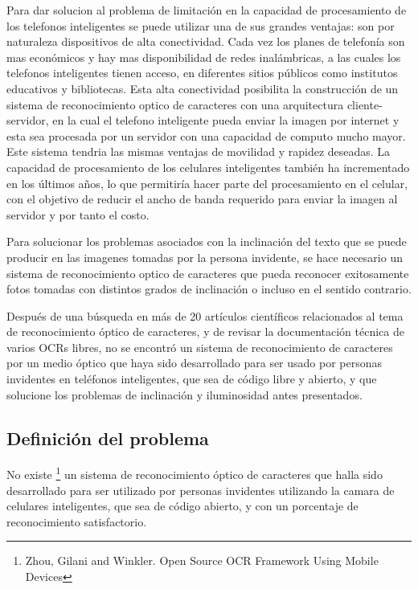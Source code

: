 \documentclass[a4paper, 11pt, oneside]{article}
\begin{document}
	Para dar solucion al problema de limitación en la capacidad de procesamiento de los telefonos inteligentes se puede utilizar una de sus grandes ventajas: son por naturaleza dispositivos de alta conectividad. Cada vez los planes de telefonía son mas económicos y hay mas disponibilidad de redes inalámbricas, a las cuales los telefonos inteligentes tienen acceso, en diferentes sitios públicos como institutos educativos y bibliotecas. Esta alta conectividad posibilita la construcción de un sistema de reconocimiento optico de caracteres con una arquitectura cliente-servidor, en la cual el telefono inteligente pueda enviar la imagen por internet y esta sea procesada por un servidor con una capacidad de computo mucho mayor. Este sistema tendria las mismas ventajas de movilidad y rapidez deseadas. La capacidad de procesamiento de los celulares inteligentes también ha incrementado en los últimos años, lo que permitiría hacer parte del procesamiento en el celular, con el objetivo de reducir el ancho de banda requerido para enviar la imagen al servidor y por tanto el costo.

	Para solucionar los problemas asociados con la inclinación del texto que se puede producir en las imagenes tomadas por la persona invidente, se hace necesario un sistema de reconocimiento optico de caracteres que pueda reconocer exitosamente fotos tomadas con distintos grados de inclinación o incluso en el sentido contrario.

Después de una búsqueda en más de 20 artículos científicos relacionados al tema de reconocimiento óptico de caracteres, y de revisar la documentación técnica de varios OCRs libres, no se encontró un sistema de reconocimiento de caracteres por un medio óptico que haya sido desarrollado para ser usado por personas invidentes en teléfonos inteligentes, que sea de código libre y abierto, y que solucione los problemas de inclinación y iluminosidad antes presentados. 	
	
	\subsection{Definición del problema}

	No existe \footnote{Zhou, Gilani and Winkler. Open Source OCR Framework Using Mobile Devices}
    un sistema de reconocimiento óptico de caracteres que halla sido desarrollado para
    ser utilizado por personas invidentes utilizando la camara de celulares inteligentes, que sea de código abierto, y con un 
    porcentaje de reconocimiento satisfactorio.
	
\end{document}
